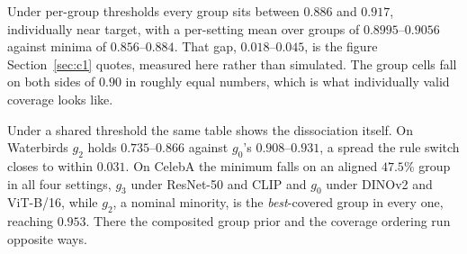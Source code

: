 \documentclass[pdflatex,sn-basic]{sn-jnl}%
\theoremstyle{thmstyleone}%
\begin{document}
\begin{appendices}
Under per-group thresholds every group sits between $0.886$ and $0.917$, individually near
target, with a per-setting mean over groups of $0.8995$--$0.9056$ against minima of
$0.856$--$0.884$. That gap, $0.018$--$0.045$, is the figure Section~\ref{sec:c1} quotes, measured
here rather than simulated. The group cells fall on both sides of $0.90$ in roughly equal numbers,
which is what individually valid coverage looks like.

Under a shared threshold the same table shows the dissociation itself. On Waterbirds $g_2$ holds
$0.735$--$0.866$ against $g_0$'s $0.908$--$0.931$, a spread the rule switch closes to within
$0.031$. On CelebA the minimum falls on an aligned $47.5\%$ group in all four settings, $g_3$ under
ResNet-50 and CLIP and $g_0$ under DINOv2 and ViT-B/16, while $g_2$, a nominal minority, is the
\emph{best}-covered group in every one, reaching $0.953$. There the composited group prior and the
coverage ordering run opposite ways.


\end{appendices}
\end{document}

